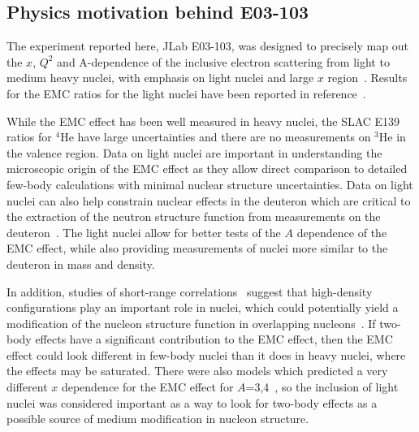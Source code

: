 \subsection{Physics motivation behind E03-103}\label{motivation.ssec}


The experiment reported here, JLab E03-103, was designed to precisely map out
the $x$, $Q^2$ and A-dependence of the inclusive electron scattering from
light to medium heavy nuclei, with emphasis on light nuclei and large $x$
region~\cite{E03103proposal}. Results for the EMC ratios for the light nuclei
have been reported in reference~\cite{seely09}. 

While the EMC effect has been well measured in heavy nuclei, the SLAC E139
ratios for $^4$He have large uncertainties and there are no measurements on
$^3$He in the valence region. Data on light nuclei are important in
understanding the microscopic origin of the EMC effect as they allow direct
comparison to detailed few-body calculations with minimal nuclear structure
uncertainties. Data on light nuclei can also help constrain nuclear effects in
the deuteron which are critical to the extraction of the neutron structure
function from measurements on the deuteron~\cite{whitlow92, Arrington:2008zh,
accardi10, accardi11, arrington12b}.  The light nuclei allow for better tests
of the $A$ dependence of the EMC effect, while also providing measurements of
nuclei more similar to the deuteron in mass and density.

In addition, studies of short-range correlations~\cite{frankfurt93,
arrington99, egiyan03, egiyan06, shneor07, subedi08, fomin12, arrington12a}
suggest that high-density configurations play an important role in nuclei,
which could potentially yield a modification of the nucleon structure function
in overlapping nucleons~\cite{geesaman95, arrington01, sargsian03,
arrington04, arrington06, fomin10}.  If two-body effects have a significant
contribution to the EMC effect, then the EMC effect could look different in
few-body nuclei than it does in heavy nuclei, where the effects may be
saturated. There were also models which predicted a very different $x$
dependence for the EMC effect for $A$=3,4~\cite{smirnov99, burov99,
benhar_priv, afnan03}, so the inclusion of light nuclei was considered
important as a way to look for two-body effects as a possible source of medium
modification in nucleon structure.



